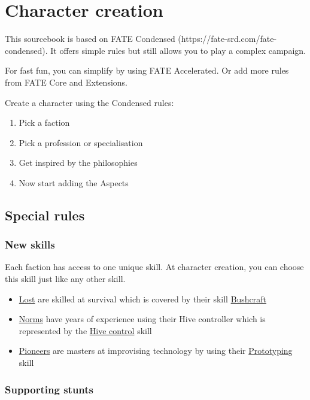 \chapter{Character creation}

This sourcebook is based on FATE Condensed (https://fate-srd.com/fate-condensed). It offers simple rules but still allows you to play a complex campaign.

For fast fun, you can simplify by using FATE Accelerated.
Or add more rules from FATE Core and Extensions.

Create a character using the Condensed rules:

\begin{enumerate}
    \item Pick a faction
    \item Pick a profession or specialisation
    \item Get inspired by the philosophies
    \item Now start adding the Aspects
\end{enumerate}

\section{Special rules}

\subsection{New skills}

Each faction has access to one unique skill. At character creation, you can choose this skill just like any other skill.
\begin{itemize}
    \item \hyperref[sec:Lost]{Lost} are skilled at survival which is covered by their skill \hyperref[sec:Bushcraft skill]{Bushcraft}
    \item \hyperref[sec:Norms]{Norms} have years of experience using their Hive controller which is represented by the \hyperref[sec:Hive control skill]{Hive control} skill
    \item \hyperref[sec:Pioneers]{Pioneers} are masters at improvising technology by using their \hyperref[sec:Prototyping skill]{Prototyping} skill
\end{itemize}

\subsection{Supporting stunts}

